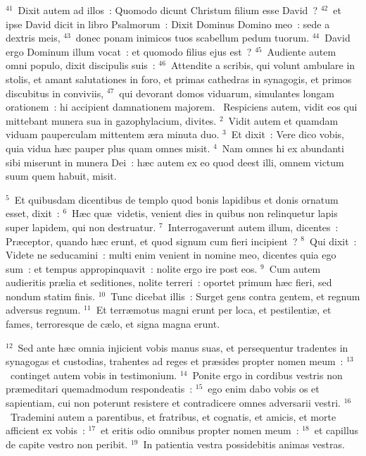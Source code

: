 ${}^{41}$~Dixit autem ad illos~: Quomodo dicunt Christum filium esse David~?
${}^{42}$~et ipse David dicit in libro Psalmorum~: Dixit Dominus Domino meo~: sede a dextris meis,
${}^{43}$~donec ponam inimicos tuos scabellum pedum tuorum.
${}^{44}$~David ergo Dominum illum vocat~: et quomodo filius ejus est~?
${}^{45}$~Audiente autem omni populo, dixit discipulis suis~:
${}^{46}$~Attendite a scribis, qui volunt ambulare in stolis, et amant salutationes in foro, et primas cathedras in synagogis, et primos discubitus in conviviis,
${}^{47}$~qui devorant domos viduarum, simulantes longam orationem~: hi accipient damnationem majorem.
~Respiciens autem, vidit eos qui mittebant munera sua in gazophylacium, divites.
${}^{2}$~Vidit autem et quamdam viduam pauperculam mittentem \ae ra minuta duo.
${}^{3}$~Et dixit~: Vere dico vobis, quia vidua h\ae c pauper plus quam omnes misit.
${}^{4}$~Nam omnes hi ex abundanti sibi miserunt in munera Dei~: h\ae c autem ex eo quod deest illi, omnem victum suum quem habuit, misit.


${}^{5}$~Et quibusdam dicentibus de templo quod bonis lapidibus et donis ornatum esset, dixit~:
${}^{6}$~H\ae c qu\ae\ videtis, venient dies in quibus non relinquetur lapis super lapidem, qui non destruatur.
${}^{7}$~Interrogaverunt autem illum, dicentes~: Pr\ae ceptor, quando h\ae c erunt, et quod signum cum fieri incipient~?
${}^{8}$~Qui dixit~: Videte ne seducamini~: multi enim venient in nomine meo, dicentes quia ego sum~: et tempus appropinquavit~: nolite ergo ire post eos.
${}^{9}$~Cum autem audieritis pr\ae lia et seditiones, nolite terreri~: oportet primum h\ae c fieri, sed nondum statim finis.
${}^{10}$~Tunc dicebat illis~: Surget gens contra gentem, et regnum adversus regnum.
${}^{11}$~Et terr\ae motus magni erunt per loca, et pestilenti\ae , et fames, terroresque de c\ae lo, et signa magna erunt.


${}^{12}$~Sed ante h\ae c omnia injicient vobis manus suas, et persequentur tradentes in synagogas et custodias, trahentes ad reges et pr\ae sides propter nomen meum~:
${}^{13}$~continget autem vobis in testimonium.
${}^{14}$~Ponite ergo in cordibus vestris non pr\ae meditari quemadmodum respondeatis~:
${}^{15}$~ego enim dabo vobis os et sapientiam, cui non poterunt resistere et contradicere omnes adversarii vestri.
${}^{16}$~Trademini autem a parentibus, et fratribus, et cognatis, et amicis, et morte afficient ex vobis~:
${}^{17}$~et eritis odio omnibus propter nomen meum~:
${}^{18}$~et capillus de capite vestro non peribit.
${}^{19}$~In patientia vestra possidebitis animas vestras.


